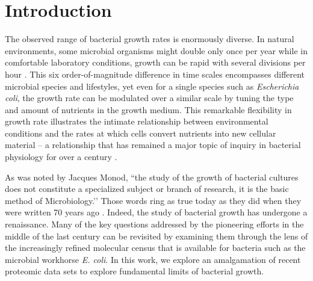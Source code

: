 \section{Introduction}
The observed range of bacterial growth rates is enormously diverse. In
natural environments, some microbial organisms might double only once per
year \citep{mikucki2009} while in comfortable laboratory conditions, growth
can be rapid with several divisions per hour \citep{schaechter1958}. This six
order-of-magnitude difference in time scales encompasses different microbial
species and lifestyles, yet even for a single species such as \textit{Escherichia
coli}, the growth rate can be modulated over a similar scale by tuning the
type and amount of nutrients in the growth medium. This remarkable
flexibility in growth rate illustrates the intimate relationship between
environmental conditions and the rates at which cells convert nutrients into
new cellular material -- a relationship that has remained a major topic of
inquiry in bacterial physiology for over a century \citep{jun2018}.

As was noted by Jacques Monod, ``the study of the growth of bacterial
cultures does not constitute a specialized subject or branch of research, it
is the basic method of Microbiology.’’ Those words ring as true today as they
did when they were written 70 years ago \citep{monod1949}. Indeed, the study
of bacterial growth has undergone a renaissance. Many of the key questions
addressed by the pioneering efforts in the middle of the last century can be
revisited by examining them through the lens of the increasingly refined
molecular census that is available for bacteria such as the microbial
workhorse \textit{E. coli}. In this work, we explore an amalgamation
of recent proteomic data sets to explore fundamental limits of bacterial growth.


